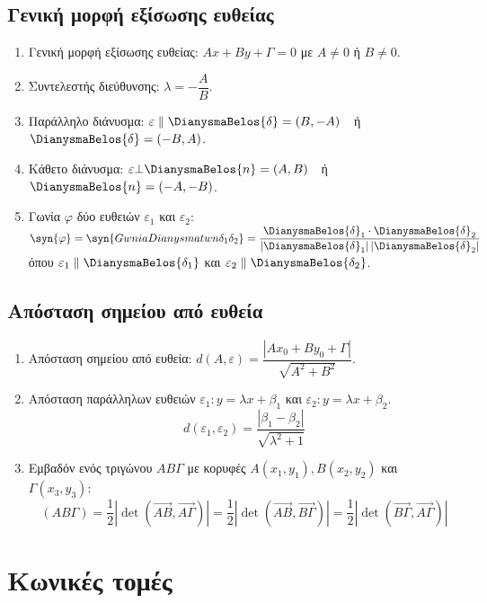 \documentclass[11pt,a4paper]{article}
\begin{document}
\subsection{Γενική μορφή εξίσωσης ευθείας}
\begin{enumerate}
\item Γενική μορφή εξίσωσης ευθείας: $ Ax+By+\varGamma=0 $ με $ A\neq0 $ ή $ B\neq0 $.
\item Συντελεστής διεύθυνσης: $ \lambda=-\dfrac{A}{B} $.
\item Παράλληλο διάνυσμα: $ \varepsilon\parallel\DianysmaBelos{\delta}=(B,-A) $\ \ ή\ \ $ \DianysmaBelos{\delta}=(-B,A) $.
\item Κάθετο διάνυσμα: $ \varepsilon\bot\DianysmaBelos{n}=(A,B) $\ \ ή\ \ $ \DianysmaBelos{n}=(-A,-B) $.
\item Γωνία $ \varphi $ δύο ευθειών $ \varepsilon_1 $ και $ \varepsilon_2 $: $ \syn{\varphi}=\syn{GwniaDianysmatwn{\delta_{1}}{\delta_{2}}}=\dfrac{\DianysmaBelos{\delta}_{1} \cdot \DianysmaBelos{\delta}_{2}}{\left|\DianysmaBelos{\delta}_{1}\right|\left|\DianysmaBelos{\delta}_{2}\right|}$ όπου $ \varepsilon_1\parallel\DianysmaBelos{\delta_1} $ και $ \varepsilon_2\parallel\DianysmaBelos{\delta_2} $.
\end{enumerate}
\subsection{Απόσταση σημείου από ευθεία}
\begin{enumerate}
\item Απόσταση σημείου από ευθεία: $ d(A,\varepsilon)=\dfrac{|Ax_0+By_0+\varGamma|}{\sqrt{A^2+B^2}} $.
\item Απόσταση παράλληλων ευθειών $ \varepsilon_1:y=\lambda x+\beta_1 $ και $ \varepsilon_2:y=\lambda x+\beta_2 $. 
\[ d(\varepsilon_1,\varepsilon_2)=\dfrac{|\beta_1-\beta_2|}{\sqrt{\lambda^2+1}} \]
\item Εμβαδόν ενός τριγώνου $ AB\varGamma $ με κορυφές $ A(x_1,y_1),B(x_2,y_2) $ και $ \varGamma(x_3,y_3) $:
\[ (AB\varGamma)=\frac{1}{2}\left|\det{(\overrightarrow{AB},\overrightarrow{A\varGamma})} \right|=\frac{1}{2}\left|\det{(\overrightarrow{AB},\overrightarrow{B\varGamma})} \right|=\frac{1}{2}\left|\det{(\overrightarrow{B\varGamma},\overrightarrow{A\varGamma})} \right| \]
\end{enumerate}
\newpage
\section{Κωνικές τομές}
\end{document}
